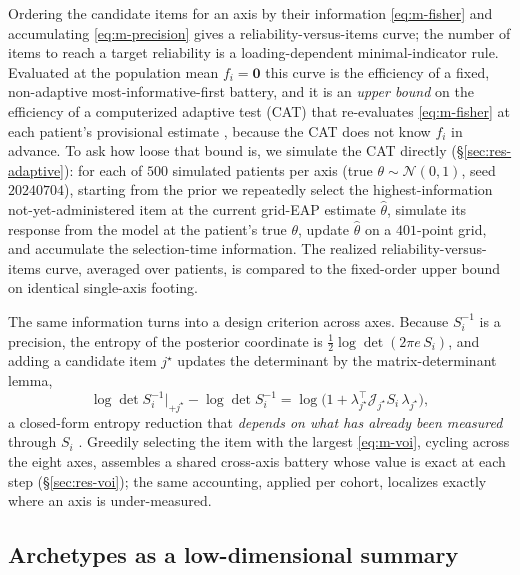 Ordering the candidate items for an axis by their information \eqref{eq:m-fisher}
and accumulating \eqref{eq:m-precision} gives a reliability-versus-items curve; the
number of items to reach a target reliability is a loading-dependent
minimal-indicator rule. Evaluated at the population mean $f_i=\mathbf 0$ this curve
is the efficiency of a fixed, non-adaptive most-informative-first battery, and it
is an \emph{upper bound} on the efficiency of a computerized adaptive test (CAT)
that re-evaluates \eqref{eq:m-fisher} at each patient's provisional estimate
\citep{vanderlinden2010cat}, because the CAT does not know $f_i$ in advance. To ask
how loose that bound is, we simulate the CAT directly (\S\ref{sec:res-adaptive}):
for each of $500$ simulated patients per axis (true $\theta\sim\mathcal N(0,1)$,
seed $20240704$), starting from the prior we repeatedly select the
highest-information not-yet-administered item at the current grid-EAP estimate
$\hat\theta$, simulate its response from the model at the patient's true $\theta$,
update $\hat\theta$ on a $401$-point grid, and accumulate the selection-time
information. The realized reliability-versus-items curve, averaged over patients,
is compared to the fixed-order upper bound on identical single-axis footing.

The same information turns into a design criterion across axes. Because
$S_i^{-1}$ is a precision, the entropy of the posterior coordinate is
$\tfrac12\log\det(2\pi e\,S_i)$, and adding a candidate item $j^\star$ updates the
determinant by the matrix-determinant lemma,
\begin{equation}
  \log\det S_i^{-1}\big|_{+j^\star}
  -\log\det S_i^{-1}
  =\log\!\big(1+\lambda_{j^\star}^{\top}\mathcal{J}_{j^\star} S_i\,\lambda_{j^\star}\big),
  \label{eq:m-voi}
\end{equation}
a closed-form entropy reduction that \emph{depends on what has already been
measured} through $S_i$ \citep{covertthomas2006,harville1997matrix}. Greedily
selecting the item with the largest \eqref{eq:m-voi}, cycling across the eight
axes, assembles a shared cross-axis battery whose value is exact at each step
(\S\ref{sec:res-voi}); the same accounting, applied per cohort, localizes exactly
where an axis is under-measured.

\subsection{Archetypes as a low-dimensional summary}
\label{sec:m-arch}

